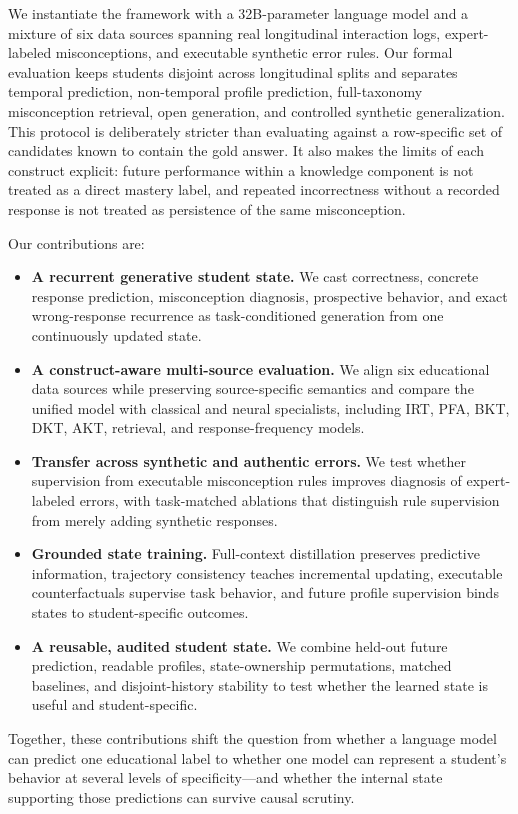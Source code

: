 We instantiate the framework with a 32B-parameter language model and a mixture
of six data sources spanning real longitudinal interaction logs, expert-labeled
misconceptions, and executable synthetic error rules.  Our formal evaluation
keeps students disjoint across longitudinal splits and separates temporal
prediction, non-temporal profile prediction, full-taxonomy misconception
retrieval, open generation, and controlled synthetic generalization.  This
protocol is deliberately stricter than evaluating against a row-specific set
of candidates known to contain the gold answer.  It also makes the limits of
each construct explicit: future performance within a knowledge component is
not treated as a direct mastery label, and repeated incorrectness without a
recorded response is not treated as persistence of the same misconception.

Our contributions are:
\begin{itemize}
    \item \textbf{A recurrent generative student state.} We cast correctness,
    concrete response prediction, misconception diagnosis, prospective
    behavior, and exact wrong-response recurrence as task-conditioned
    generation from one continuously updated state.
    \item \textbf{A construct-aware multi-source evaluation.} We align six
    educational data sources while preserving source-specific semantics and
    compare the unified model with classical and neural specialists, including
    IRT, PFA, BKT, DKT, AKT, retrieval, and response-frequency models.
    \item \textbf{Transfer across synthetic and authentic errors.} We test
    whether supervision from executable misconception rules improves diagnosis
    of expert-labeled errors, with task-matched ablations that distinguish rule
    supervision from merely adding synthetic responses.
    \item \textbf{Grounded state training.} Full-context distillation preserves
    predictive information, trajectory consistency teaches incremental
    updating, executable counterfactuals supervise task behavior, and future
    profile supervision binds states to student-specific outcomes.
    \item \textbf{A reusable, audited student state.} We combine held-out future
    prediction, readable profiles, state-ownership permutations, matched
    baselines, and disjoint-history stability to test whether the learned state
    is useful and student-specific.
\end{itemize}

Together, these contributions shift the question from whether a language model
can predict one educational label to whether one model can represent a
student's behavior at several levels of specificity---and whether the internal
state supporting those predictions can survive causal scrutiny.
